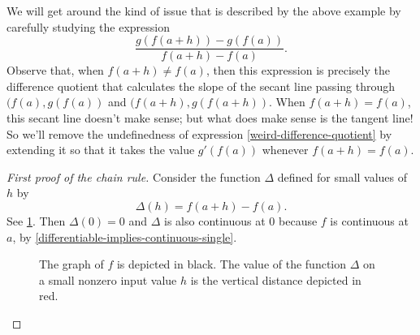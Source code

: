 We will get around the kind of issue that is described by the above example by carefully studying the expression
\begin{equation} \label{weird-difference-quotient} \frac{g(f(a+h)) - g(f(a))}{f(a+h)-f(a)}. \end{equation}
Observe that, when $f(a+h)\neq f(a)$, then this expression is precisely the difference quotient that calculates the slope of the secant line passing through $(f(a), g(f(a))$ and $(f(a+h), g(f(a+h))$. When $f(a+h) = f(a)$, this secant line doesn't make sense; but what does make sense is the tangent line! So we'll remove the undefinedness of expression \eqref{weird-difference-quotient} by extending it so that it takes the value $g'(f(a))$ whenever $f(a+h) = f(a)$. 

\begin{proof}[First proof of the chain rule]
	Consider the function $\Delta$ defined for small values of $h$ by \[ \Delta(h) = f(a+h)-f(a). \]
	See \cref{value-difference-chain-rule}. Then $\Delta(0) = 0$ and $\Delta$ is also continuous at 0 because $f$ is continuous at $a$, by \cref{differentiable-implies-continuous-single}. 
	
	\begin{figure}[t]
		\begin{center}
		\end{center}
		\caption{The graph of $f$ is depicted in black. The value of the function $\Delta$ on a small nonzero input value $h$ is the vertical distance depicted in red.}  \label{value-difference-chain-rule}
	\end{figure}


\end{proof}
